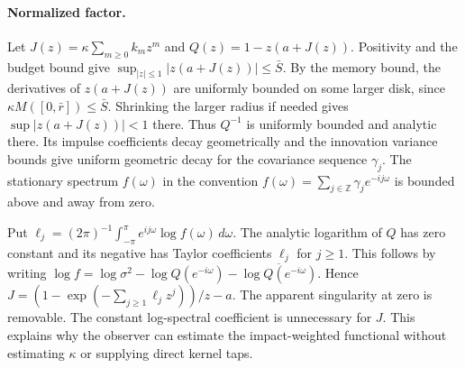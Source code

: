 \documentclass[12pt]{article}
\theoremstyle{definition}
\theoremstyle{remark}
\begin{document}
\paragraph{Normalized factor.}
Let $J(z)=\kappa\sum_{m\ge0}k_m z^m$ and $Q(z)=1-z(a+J(z))$. Positivity and the
budget bound give $\sup_{|z|\le1}|z(a+J(z))|\le\bar S$. By the memory bound, the
derivatives of $z(a+J(z))$ are uniformly bounded on some larger disk, since
$\kappa M([0,\bar r])\le\bar S$. Shrinking the larger radius if needed gives
$\sup|z(a+J(z))|<1$ there. Thus $Q^{-1}$ is uniformly bounded and analytic there.
Its impulse coefficients decay geometrically and the innovation variance
bounds give uniform geometric decay for the covariance sequence $\gamma_j$.
The stationary spectrum $f(\omega)$ in the convention
$f(\omega)=\sum_{j\in\mathbb Z}\gamma_j e^{-ij\omega}$ is bounded above and away
from zero.

Put $\ell_j=(2\pi)^{-1}\int_{-\pi}^\pi e^{ij\omega}\log f(\omega)\,d\omega$.
The analytic logarithm of $Q$ has zero constant and its negative has Taylor
coefficients $\ell_j$ for $j\ge1$. This follows by writing
$\log f=\log\sigma^2-\log Q(e^{-i\omega})-\overline{\log Q(e^{-i\omega})}$.
Hence $J=(1-\exp(-\sum_{j\ge1}\ell_j z^j))/z-a$. The apparent singularity at
zero is removable. The constant log-spectral coefficient is unnecessary for
$J$. This explains why the observer can estimate the impact-weighted functional
without estimating $\kappa$ or supplying direct kernel taps.
\end{document}
